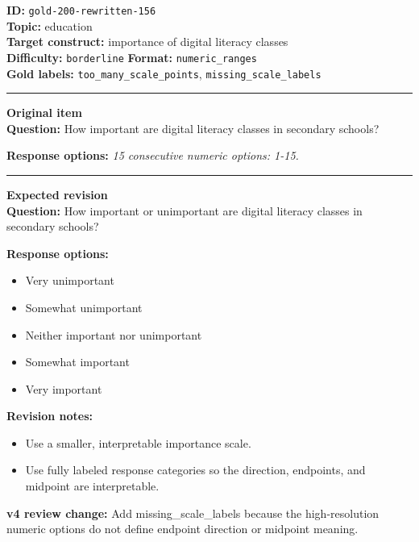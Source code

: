 \documentclass[10pt,a4paper]{article}
\newcommand{\sectionline}{\vspace{0.15em}\hrule\vspace{0.35em}}
\begin{document}
\begin{tcolorbox}[colframe=FlawRed,colback=white,colbacktitle=FlawRed!9,coltitle=black,title={Item 156\hfill Flawed item}]
\textbf{ID:} \texttt{gold-200-rewritten-156}\\
\textbf{Topic:} education\\
\textbf{Target construct:} importance of digital literacy classes\\
\textbf{Difficulty:} \texttt{borderline} \quad \textbf{Format:} \texttt{numeric\_ranges}\\
\textbf{Gold labels:} \texttt{too\_many\_scale\_points}, \texttt{missing\_scale\_labels}\\
\sectionline
\textbf{Original item}\\
\textbf{Question:} How important are digital literacy classes in secondary schools?
\par\textbf{Response options:}
\textit{15 consecutive numeric options: 1-15.}
\sectionline
\textbf{Expected revision}\\
\textbf{Question:} How important or unimportant are digital literacy classes in secondary schools?
\par\textbf{Response options:}
\begin{itemize}
\item Very unimportant
\item Somewhat unimportant
\item Neither important nor unimportant
\item Somewhat important
\item Very important
\end{itemize}
\par\textbf{Revision notes:}
\begin{itemize}
\item Use a smaller, interpretable importance scale.
\item Use fully labeled response categories so the direction, endpoints, and midpoint are interpretable.
\end{itemize}
\par\textbf{v4 review change:} Add missing\_scale\_labels because the high-resolution numeric options do not define endpoint direction or midpoint meaning.
\end{tcolorbox}
\end{document}
